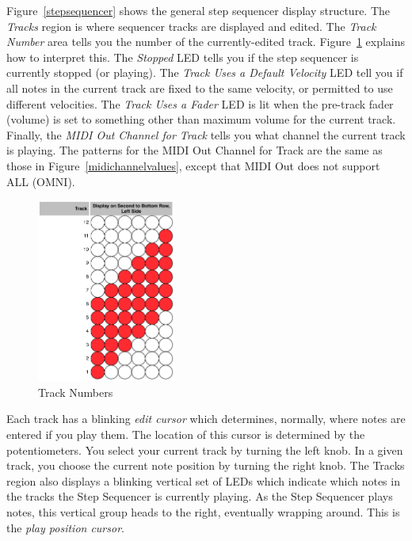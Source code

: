 \documentclass{article}
\begin{document}
Figure~\ref{stepsequencer} shows the general step sequencer display structure.  The {\it Tracks} region is where sequencer tracks are displayed and edited.  The {\it Track Number} area tells you the number of the currently-edited track.  Figure~\ref{tracknumber} explains how to interpret this.  The {\it Stopped} LED tells you if the step sequencer is currently stopped (or playing).  The {\it Track Uses a Default Velocity} LED tell you if all notes in the current track are fixed to the same velocity, or permitted to use different velocities.  The {\it Track Uses a Fader} LED is lit when the pre-track fader (volume) is set to something other than maximum volume for the current track.  Finally, the {\it MIDI Out Channel for Track} tells you what channel the current track is playing.  The patterns for the MIDI Out Channel for Track are the same as those in Figure~\ref{midichannelvalues}, except that MIDI Out does not support ALL (OMNI).

\clearpage

\begin{figure}
\includegraphics[width=1.8in]{track.pdf}
\vspace{-2em}\caption{\small Track Numbers}\vspace{-2em}
\label{tracknumber}
\end{figure}

Each track has a blinking {\it edit cursor} which determines, normally, where notes are entered if you play them.  The location of this cursor is determined by the potentiometers.  You select your current track by turning the left knob.  In a given track, you choose the current note position by turning the right knob.  The Tracks region also displays a blinking vertical set of LEDs which indicate which notes in the tracks the Step Sequencer is currently playing.  As the Step Sequencer plays notes, this vertical group heads to the right, eventually wrapping around.  This is the {\it play position cursor}.
\end{document}

